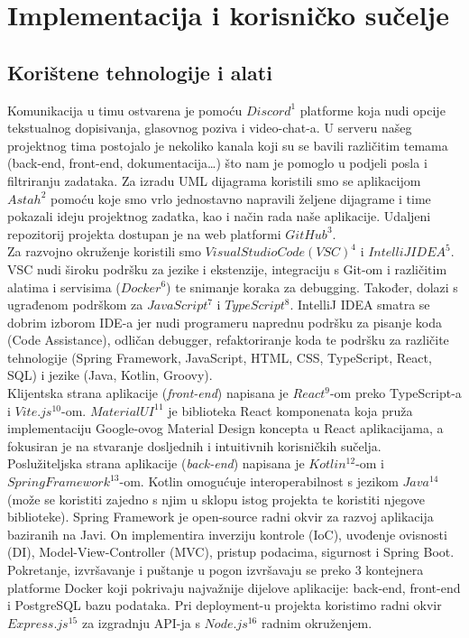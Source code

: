 \chapter{Implementacija i korisničko sučelje}
		
		
		\section{Korištene tehnologije i alati}
		
			Komunikacija u timu ostvarena je pomoću $Discord^{1}$ platforme koja nudi opcije tekstualnog dopisivanja, glasovnog poziva i video-chat-a. U serveru našeg projektnog tima postojalo je nekoliko kanala koji su se bavili različitim temama (back-end, front-end, dokumentacija…) što nam je pomoglo u podjeli posla i filtriranju zadataka. Za izradu UML dijagrama koristili smo se aplikacijom $Astah^{2}$ pomoću koje smo vrlo jednostavno napravili željene dijagrame i time pokazali ideju projektnog zadatka, kao i način rada naše aplikacije. Udaljeni repozitorij projekta dostupan je na web platformi $GitHub^{3}$.\\
Za razvojno okruženje koristili smo $Visual Studio Code (VSC)^{4}$ i $IntelliJ IDEA^{5}$. VSC nudi široku podršku za jezike i ekstenzije, integraciju s Git-om i različitim alatima i servisima ($Docker^{6}$) te snimanje koraka za debugging. Također, dolazi s ugrađenom podrškom za $JavaScript^{7}$ i $TypeScript^{8}$. IntelliJ IDEA smatra se dobrim izborom IDE-a jer nudi programeru naprednu podršku za pisanje koda (Code Assistance), odličan debugger, refaktoriranje koda te podršku za različite tehnologije (Spring Framework, JavaScript, HTML, CSS, TypeScript, React, SQL) i jezike (Java, Kotlin, Groovy). \\
Klijentska strana aplikacije (\textit{front-end}) napisana je $React^{9}$-om preko TypeScript-a i $Vite.js^{10}$-om. $Material UI^{11}$ je biblioteka React komponenata koja pruža implementaciju Google-ovog Material Design koncepta u React aplikacijama, a fokusiran je na stvaranje dosljednih i intuitivnih korisničkih sučelja.\\
Poslužiteljska strana aplikacije (\textit{back-end}) napisana je $Kotlin^{12}$-om i $Spring Framework^{13}$-om. Kotlin omogućuje interoperabilnost s jezikom $Java^{14}$ (može se koristiti zajedno s njim u sklopu istog projekta te koristiti njegove biblioteke). Spring Framework je open-source radni okvir za razvoj aplikacija baziranih na Javi. On implementira inverziju kontrole (IoC), uvođenje ovisnosti (DI), Model-View-Controller (MVC), pristup podacima, sigurnost i Spring Boot.\\
Pokretanje, izvršavanje i puštanje u pogon izvršavaju se preko 3 kontejnera platforme Docker koji pokrivaju najvažnije dijelove aplikacije: back-end, front-end i PostgreSQL bazu podataka. Pri deployment-u projekta koristimo radni okvir $Express.js^{15}$ za izgradnju API-ja s $Node.js^{16}$ radnim okruženjem.\\



